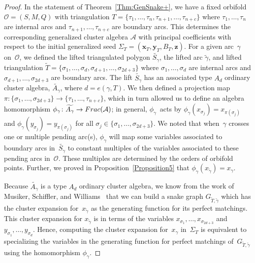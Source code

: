 \documentclass[11pt]{article}
\numberwithin{equation}{section}
\begin{document}
\begin{proof} In the statement of Theorem~\ref{Thm:GenSnake+}, we have a fixed orbifold $\mathcal{O} = (S,M,Q)$ with triangulation $T = \{\tau_1,\dots,\tau_n,\tau_{n+1},\dots,\tau_{n+c} \}$ where $\tau_1,\dots,\tau_n$ are internal arcs and $\tau_{n+1},\dots,\tau_{n+c}$ are boundary arcs. This determines the corresponding generalized cluster algebra $\mathcal{A}$ with principal coefficients with respect to the initial generalized seed $\Sigma_T = (\mathbf{x}_T,\mathbf{y}_T,B_T,\mathbf{z})$. For a given arc~$\gamma$ on~$\mathcal{O}$, we defined the lifted triangulated polygon $\widetilde{S_{\gamma}}$, the lifted arc $\widetilde{\gamma}$, and lifted triangulation $\widetilde{T} = \{\sigma_1, \dots, \sigma_d, \sigma_{d+1}, \dots, \sigma_{2d+3} \}$ where $\sigma_1,\dots,\sigma_d$ are internal arcs and $\sigma_{d+1},\dots,\sigma_{2d+3}$ are boundary arcs. The lift $\widetilde{S_\gamma}$ has an associated type $A_d$ ordinary cluster algebra, $\widetilde{A_\gamma}$, where $d = e(\gamma,T)$. We then defined a projection map $\pi\colon \{ \sigma_1,\dots,\sigma_{2d+3} \} \rightarrow \{ \tau_1,\dots,\tau_{n+c} \}$, which in turn allowed us to define an algebra homomorphism $\phi_\gamma\colon \widetilde{A_\gamma} \rightarrow {\rm Frac}(\mathcal{A})$; in general, $\phi_\gamma$~acts by $\phi_\gamma(x_{\sigma_j}) = x_{\pi(\sigma_{j})}$ and $\phi_\gamma(y_{\sigma_j}) = y_{\pi(\sigma_{j})}$ for all $\sigma_j \in \{\sigma_1, \dots, \sigma_{2d+3} \}$. We noted that when~$\gamma$ crosses one or multiple pending arc(s), $\phi_\gamma$ will map some variables associated to boundary arcs in~$\widetilde{S_\gamma}$ to constant multiples of the variables associated to these pending arcs in~$\mathcal{O}$. These multiples are determined by the orders of orbifold points.
Further, we proved in Proposition~\ref{Proposition5} that $\phi_\gamma(x_{\widetilde{\gamma}}) = x_{\gamma}$.

Because $\widetilde{A_\gamma}$ is a type $A_d$ ordinary cluster algebra, we know from the work of Musiker, Schiffler, and Williams~\cite{MSW} that we can build a snake graph $G_{\widetilde{T},\widetilde{\gamma}}$ which has the cluster expansion for~$x_{\widetilde{\gamma}}$ as the generating function for its perfect matchings. This cluster expansion for $x_{\widetilde{\gamma}}$ is in terms of the variables $x_{\sigma_1}, \dots, x_{\sigma_{2d+3}}$ and $y_{\sigma_1},\dots, y_{\sigma_{d}}$. Hence, computing the cluster expansion for~$x_\gamma$ in~$\Sigma_T$ is equivalent to specializing the variables in the generating function for perfect matchings of~$G_{\widetilde{T},\widetilde{\gamma}}$ using the homomorphism $\phi_\gamma$.


\end{proof}
\end{document}
